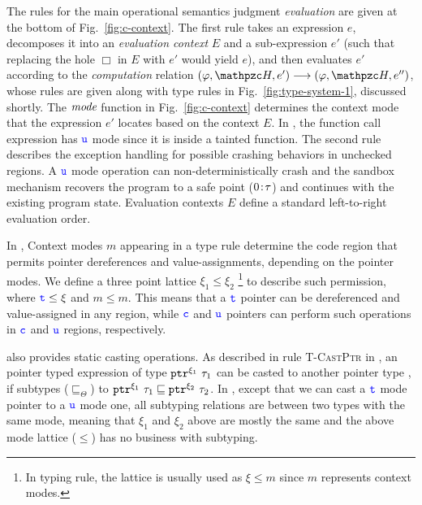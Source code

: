 The rules for the main operational semantics
judgment \emph{evaluation} are given at the bottom of
Fig.~\ref{fig:c-context}.
The first rule takes an expression $e$, decomposes
it into an \emph{evaluation context} $E$ and a sub-expression $e'$
(such that replacing the hole $\Box$ in $E$ with $e'$ would yield
$e$), and then evaluates $e'$ according to the \emph{computation}
  relation $(\varphi,\heap,e') \longrightarrow (\varphi,\heap,e'')$,
whose rules are given along with type rules in Fig.~\ref{fig:type-system-1}, discussed
shortly.
The $\textit{mode}$ function in Fig.~\ref{fig:c-context}
determines the context mode that the expression $e'$ locates based on the context $E$.
In , the function call expression  has $\textcolor{blue}{\texttt{u}}$ mode since it is inside a tainted function.
The second rule describes the exception handling 
for possible crashing behaviors in unchecked regions.
A $\textcolor{blue}{\texttt{u}}$ mode operation can non-deterministically crash
and the \systemname sandbox mechanism recovers
the program to a safe point (${0}\!:\!{\tau}$)
and continues with the existing program state.
Evaluation contexts $E$ define a standard left-to-right evaluation order. 

In \lang, Context modes $m$ appearing in a type rule determine the code region 
that permits pointer dereferences and value-assignments, depending on the pointer modes.
We define a three point lattice $\xi_1 \le \xi_2$ \footnote{In typing rule, the lattice is usually used as $\xi \le m$ since $m$ represents context modes.} to describe such permission, where $\textcolor{blue}{\texttt{t}} \le \xi$ and $m \le m$.
This means that a $\textcolor{blue}{\texttt{t}}$ pointer can be dereferenced and value-assigned in any region, while $\textcolor{blue}{\texttt{c}}$ and $\textcolor{blue}{\texttt{u}}$ pointers can perform such operations in $\textcolor{blue}{\texttt{c}}$ and $\textcolor{blue}{\texttt{u}}$ regions, respectively.

\lang also provides static casting operations. As described in rule \textsc{T-CastPtr} in ,
an pointer typed expression of type $\mathtt{ptr}^{\xi_1}~{\tau_1}$ can be casted to another pointer type ,
if  subtypes ($\sqsubseteq_{\Theta}$) to  $\mathtt{ptr}^{\xi_1}~{\tau_1} \sqsubseteq \mathtt{ptr}^{\xi_2}~{\tau_2}$.
In \lang, except that we can cast a $\textcolor{blue}{\texttt{t}}$ mode pointer to a $\textcolor{blue}{\texttt{u}}$ mode one, all subtyping relations are between two types with the same mode, meaning that $\xi_1$ and $\xi_2$ above are mostly the same and the above mode lattice ($\le$) has no business with subtyping.

